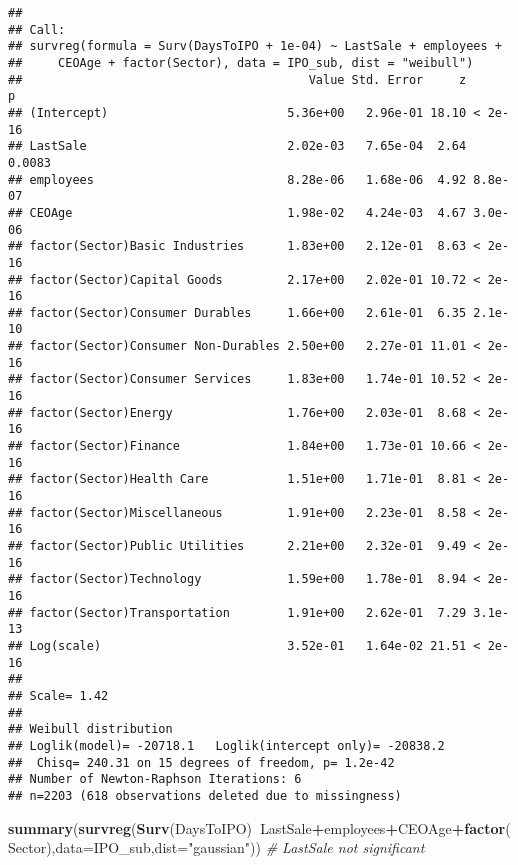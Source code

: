 \documentclass[]{article}
\newenvironment{Shaded}{\begin{snugshade}}{\end{snugshade}}
\newcommand{\CommentTok}[1]{\textcolor[rgb]{0.56,0.35,0.01}{\textit{#1}}}
\newcommand{\DataTypeTok}[1]{\textcolor[rgb]{0.13,0.29,0.53}{#1}}
\newcommand{\KeywordTok}[1]{\textcolor[rgb]{0.13,0.29,0.53}{\textbf{#1}}}
\newcommand{\NormalTok}[1]{#1}
\newcommand{\OperatorTok}[1]{\textcolor[rgb]{0.81,0.36,0.00}{\textbf{#1}}}
\newcommand{\StringTok}[1]{\textcolor[rgb]{0.31,0.60,0.02}{#1}}
\begin{document}
\begin{verbatim}
## 
## Call:
## survreg(formula = Surv(DaysToIPO + 1e-04) ~ LastSale + employees + 
##     CEOAge + factor(Sector), data = IPO_sub, dist = "weibull")
##                                        Value Std. Error     z       p
## (Intercept)                         5.36e+00   2.96e-01 18.10 < 2e-16
## LastSale                            2.02e-03   7.65e-04  2.64  0.0083
## employees                           8.28e-06   1.68e-06  4.92 8.8e-07
## CEOAge                              1.98e-02   4.24e-03  4.67 3.0e-06
## factor(Sector)Basic Industries      1.83e+00   2.12e-01  8.63 < 2e-16
## factor(Sector)Capital Goods         2.17e+00   2.02e-01 10.72 < 2e-16
## factor(Sector)Consumer Durables     1.66e+00   2.61e-01  6.35 2.1e-10
## factor(Sector)Consumer Non-Durables 2.50e+00   2.27e-01 11.01 < 2e-16
## factor(Sector)Consumer Services     1.83e+00   1.74e-01 10.52 < 2e-16
## factor(Sector)Energy                1.76e+00   2.03e-01  8.68 < 2e-16
## factor(Sector)Finance               1.84e+00   1.73e-01 10.66 < 2e-16
## factor(Sector)Health Care           1.51e+00   1.71e-01  8.81 < 2e-16
## factor(Sector)Miscellaneous         1.91e+00   2.23e-01  8.58 < 2e-16
## factor(Sector)Public Utilities      2.21e+00   2.32e-01  9.49 < 2e-16
## factor(Sector)Technology            1.59e+00   1.78e-01  8.94 < 2e-16
## factor(Sector)Transportation        1.91e+00   2.62e-01  7.29 3.1e-13
## Log(scale)                          3.52e-01   1.64e-02 21.51 < 2e-16
## 
## Scale= 1.42 
## 
## Weibull distribution
## Loglik(model)= -20718.1   Loglik(intercept only)= -20838.2
##  Chisq= 240.31 on 15 degrees of freedom, p= 1.2e-42 
## Number of Newton-Raphson Iterations: 6 
## n=2203 (618 observations deleted due to missingness)
\end{verbatim}

\begin{Shaded}
\begin{Highlighting}[]
\KeywordTok{summary}\NormalTok{(}\KeywordTok{survreg}\NormalTok{(}\KeywordTok{Surv}\NormalTok{(DaysToIPO)}\OperatorTok{~}\NormalTok{LastSale}\OperatorTok{+}\NormalTok{employees}\OperatorTok{+}\NormalTok{CEOAge}\OperatorTok{+}\KeywordTok{factor}\NormalTok{(Sector),}\DataTypeTok{data=}\NormalTok{IPO_sub,}\DataTypeTok{dist=}\StringTok{"gaussian"}\NormalTok{)) }\CommentTok{# LastSale not significant}
\end{Highlighting}
\end{Shaded}
\end{document}
